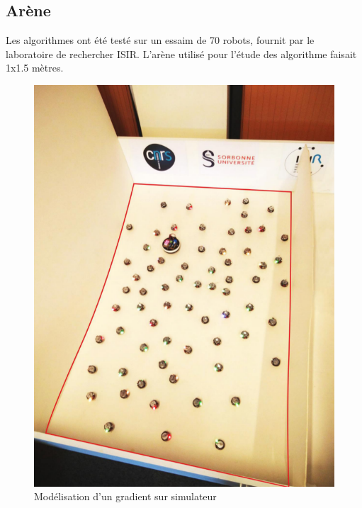 \documentclass[a4paper]{article}
\begin{document}
\subsection{Arène}
Les algorithmes ont été testé sur un essaim de 70 robots, fournit par le laboratoire de rechercher ISIR. L'arène utilisé pour l'étude des algorithme faisait 1x1.5 mètres.\\
\begin{figure}[h]
	\begin{center}
		\centering
		\includegraphics[scale=0.4,angle=-90]{../../script_results/arene.png}
		\caption{Modélisation  d'un gradient sur simulateur}
	\end{center}
\end{figure} \\
\end{document}
